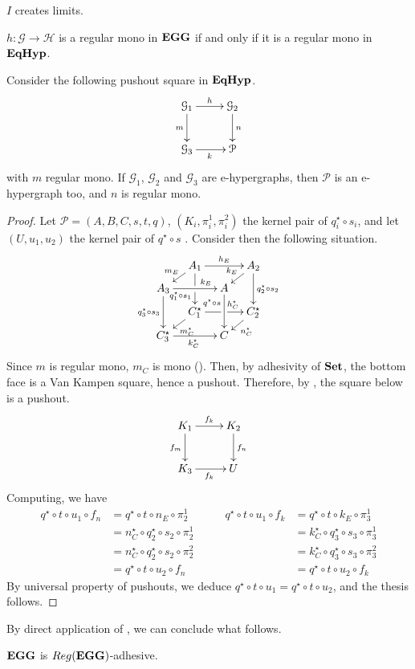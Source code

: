 \begin{corollary}
	$I$ creates limits.
\end{corollary}

\begin{corollary}
	$h: \mathcal{G \to H}$ is a regular mono in $\textbf{\textup{EGG}}$ if and only if it is a regular mono in $\textbf{\textup{EqHyp}}$.
\end{corollary}

\begin{lemma}
	Consider the following pushout square in $\textbf{\textup{EqHyp}}$.
	\[\xymatrix{\mathcal{G}_1 \ar[r]^{h}\ar[d]_{m}&\mathcal{G}_2\ar[d]^{n}\\\mathcal{G}_3\ar[r]_{k}&\mathcal{P}}\]
with $m$ regular mono. If $\mathcal{G}_1$, $\mathcal{G}_2$ and $\mathcal{G}_3$ are e-hypergraphs, then $\mathcal{P}$ is an e-hypergraph too, and $n$ is regular mono.
\end{lemma}

\begin{proof}
	Let $\mathcal{P} = (A, B, C, s, t, q)$, $(K_i, \pi_i^1, \pi_i^2)$ the kernel pair of $q_i^\star \circ s_i$, and let $(U, u_1, u_2)$ the kernel pair of $q^\star \circ s$ .
	Consider then the following situation.
	\[\xymatrix@C=10pt@R=6pt{&A_1\ar[dd]|\hole_(.65){q_1^\star \circ s_1}\ar[rr]^{h_E} \ar[dl]_{m_E} && A_2 \ar[dd]^{q_2^\star \circ s_2} \ar[dl]_{k_E} \\ A_3 \ar[dd]_{q_3^\star \circ s_3}\ar[rr]^(.7){k_E} & & A \ar[dd]_(.3){q^\star \circ s}\\&{C_1^\star}\ar[rr]|\hole^(.65){h_C^\star}\ar[dl]^{m_C^\star} && {C_2^\star} \ar[dl]^{n_C^\star} \\{C_3^\star} \ar[rr]_{k_C^\star} & & C}\]
	Since $m$ is regular mono, $m_C$ is mono ({\color{red}{inserire citazione}}). Then, by adhesivity of $\mathbf{Set}$, the bottom face is a Van Kampen square, hence a pushout. Therefore, by  , the square below is a pushout.
	\[\xymatrix{K_1\ar[r]^{f_k}\ar[d]_{f_m}&K_2\ar[d]^{f_n}\\K_3\ar[r]_{f_k}&U}\]
       Computing, we have
        \[
                \begin{split}
                        q^\star \circ t \circ u_1 \circ f_n &= q^\star \circ t \circ n_E \circ \pi_2^1 \\ &= n_C^\star \circ q_2^\star \circ s_2 \circ \pi_2^1 \\&= n_C^\star \circ q_2^\star \circ s_2 \circ \pi_2^2 \\&=q^\star \circ t \circ u_2 \circ f_n 
                        \end{split}
                        \qquad
                        \begin{split} q^\star \circ t \circ u_1 \circ f_k &= q^\star \circ t \circ k_E \circ \pi_3^1 \\ &= k_C^\star \circ q_3^\star \circ s_3 \circ \pi_3^1 \\&= k_C^\star \circ q_3^\star \circ s_3 \circ \pi_3^2 \\&=q^\star \circ t \circ u_2 \circ f_k
                        \end{split}
        \]
        By universal property of pushouts, we deduce $q^\star \circ t \circ u_1 = q^\star \circ t \circ u_2$, and the thesis follows.
\end{proof}

By direct application of , we can conclude what follows.

\begin{corollary}
	$\textbf{\textup{EGG}}$ is $\reg(\egg)$-adhesive.
\end{corollary}
